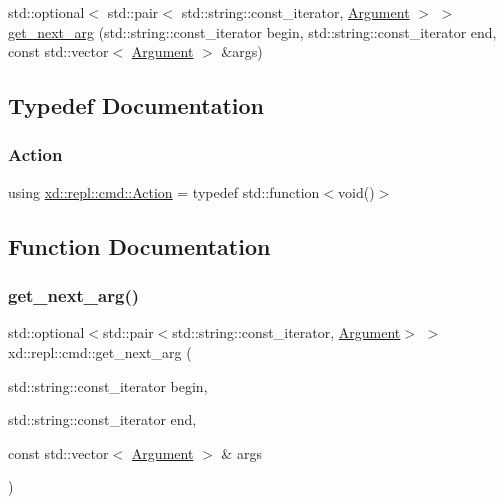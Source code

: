 \begin{DoxyCompactItemize}
\item 
std\+::optional$<$ std\+::pair$<$ std\+::string\+::const\+\_\+iterator, \mbox{\hyperlink{classxd_1_1repl_1_1cmd_1_1_argument}{Argument}} $>$ $>$ \mbox{\hyperlink{namespacexd_1_1repl_1_1cmd_aa48b6e9c032ed0bb03702033342b0dc2}{get\+\_\+next\+\_\+arg}} (std\+::string\+::const\+\_\+iterator begin, std\+::string\+::const\+\_\+iterator end, const std\+::vector$<$ \mbox{\hyperlink{classxd_1_1repl_1_1cmd_1_1_argument}{Argument}} $>$ \&args)
\end{DoxyCompactItemize}


\subsection{Typedef Documentation}
\mbox{\label{namespacexd_1_1repl_1_1cmd_a7274841bd02a9c5da0ba48ae204ab3d5}} 
\subsubsection{\texorpdfstring{Action}{Action}}
{\footnotesize\ttfamily using \mbox{\hyperlink{namespacexd_1_1repl_1_1cmd_a7274841bd02a9c5da0ba48ae204ab3d5}{xd\+::repl\+::cmd\+::\+Action}} = typedef std\+::function$<$void()$>$}



\subsection{Function Documentation}
\mbox{\label{namespacexd_1_1repl_1_1cmd_aa48b6e9c032ed0bb03702033342b0dc2}} 
\subsubsection{\texorpdfstring{get\+\_\+next\+\_\+arg()}{get\_next\_arg()}}
{\footnotesize\ttfamily std\+::optional$<$std\+::pair$<$std\+::string\+::const\+\_\+iterator, \mbox{\hyperlink{classxd_1_1repl_1_1cmd_1_1_argument}{Argument}}$>$ $>$ xd\+::repl\+::cmd\+::get\+\_\+next\+\_\+arg (\begin{DoxyParamCaption}\item[{std\+::string\+::const\+\_\+iterator}]{begin,  }\item[{std\+::string\+::const\+\_\+iterator}]{end,  }\item[{const std\+::vector$<$ \mbox{\hyperlink{classxd_1_1repl_1_1cmd_1_1_argument}{Argument}} $>$ \&}]{args }\end{DoxyParamCaption})}

